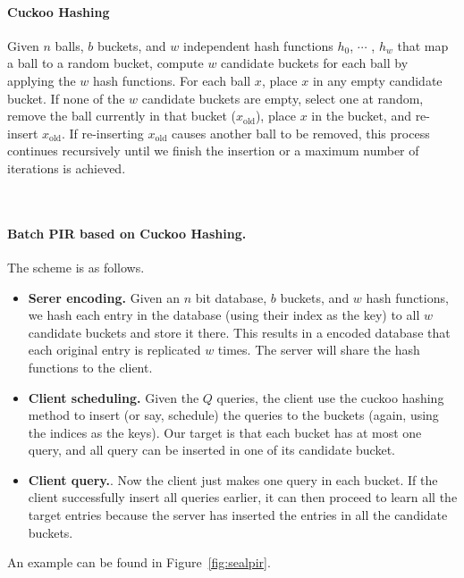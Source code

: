     \paragraph{Cuckoo Hashing}
    \begin{definition}
        Given $n$ balls, $b$ buckets, and $w$
independent hash functions $h_0$, $\cdots$ , $h_{w}$ that map a ball to a
random bucket, compute $w$ candidate buckets for each ball by
applying the $w$ hash functions. For each ball $x$, place $x$ in any
empty candidate bucket. If none of the $w$ candidate buckets
are empty, select one at random, remove the ball currently in
that bucket ($x_{\text{old}}$), place $x$ in the bucket, and re-insert $x_{\text{old}}$. If
re-inserting $x_{\text{old}}$ causes another ball to be removed, this process
continues recursively until we finish the insertion or a maximum number of iterations is achieved.
    \end{definition} \
    
\paragraph{Batch PIR based on Cuckoo Hashing.}   
The scheme is as follows.
\begin{itemize}
    \item \textbf{Serer encoding.} Given an $n$ bit database, $b$ buckets, and $w$ hash functions, we hash each entry in the database (using their index as the key) to all $w$ candidate buckets and store it there.
    This results in a encoded database that each original entry is replicated $w$ times.
    The server will share the hash functions to the client.
    
    \item \textbf{Client scheduling.} Given the $Q$ queries, the client use the cuckoo hashing method to insert (or say, schedule) the queries to the buckets (again, using the indices as the keys).
    Our target is that each bucket has at most one query, and all query can be inserted in one of its candidate bucket.
    
    \item \textbf{Client query.}. Now the client just makes one query in each bucket. If the client successfully insert all queries earlier, it can then proceed to learn all the target entries because the server has inserted the entries in all the candidate buckets.
\end{itemize}

An example can be found in Figure~\ref{fig:sealpir}.
   
